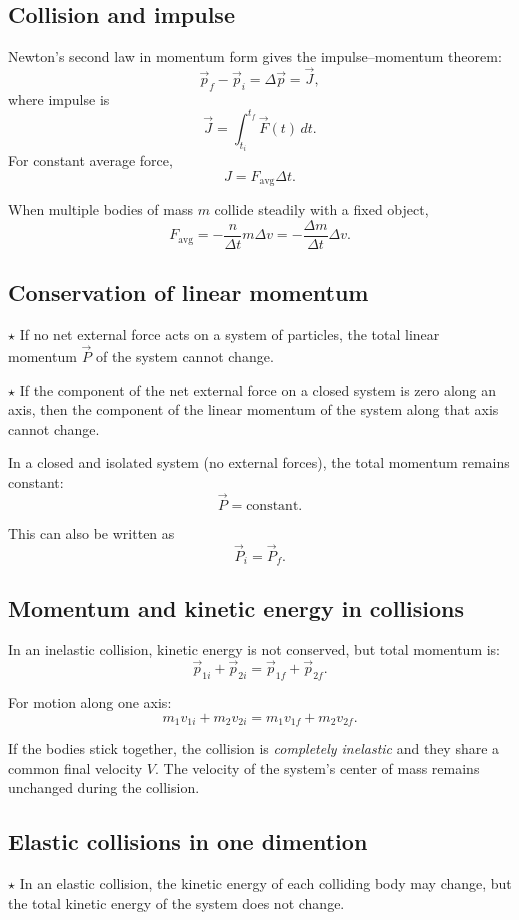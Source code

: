 \subsection{Collision and impulse}
Newton’s second law in momentum form gives the impulse–momentum theorem:
\[
\vec{p}_f - \vec{p}_i = \Delta \vec{p} = \vec{J},
\]
where impulse is
\[
\vec{J} = \int_{t_i}^{t_f} \vec{F}(t)\,dt.
\]
For constant average force,
\[
J = F_{\text{avg}} \Delta t.
\]

When multiple bodies of mass \( m \) collide steadily with a fixed object,
\[
F_{\text{avg}} = -\frac{n}{\Delta t} m \Delta v = -\frac{\Delta m}{\Delta t} \Delta v.
\]

\subsection{Conservation of linear momentum}
\noindent $\star$ If no net external force acts on a system of particles, the total linear momentum $\vec{P}$ of the system cannot change.

\noindent $\star$ If the component of the net external force on a closed system is zero along an
axis, then the component of the linear momentum of the system along that axis cannot change.


In a closed and isolated system (no external forces), the total momentum remains constant:
\[
\vec{P} = \text{constant}.
\]

This can also be written as
\[
\vec{P}_i = \vec{P}_f.
\]

\subsection{Momentum and kinetic energy in collisions}
In an inelastic collision, kinetic energy is not conserved, but total momentum is:
\[
\vec{p}_{1i} + \vec{p}_{2i} = \vec{p}_{1f} + \vec{p}_{2f}.
\]

For motion along one axis:
\[
m_1 v_{1i} + m_2 v_{2i} = m_1 v_{1f} + m_2 v_{2f}.
\]

If the bodies stick together, the collision is \textit{completely inelastic} and they share a common final velocity \(V\).  
The velocity of the system’s center of mass remains unchanged during the collision.

\subsection{Elastic collisions in one dimention}
\noindent $\star$ In an elastic collision, the kinetic energy of each colliding body may change, but
the total kinetic energy of the system does not change.

